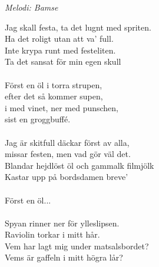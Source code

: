 {\footnotesize\textit{Melodi: Bamse}}\par
\vspace{10pt}
Jag skall festa, ta det lugnt med spriten.\\
Ha det roligt utan att va' full.\\
Inte krypa runt med festeliten.\\
Ta det sansat för min egen skull\\
\\
Först en öl i torra strupen,\\
efter det så kommer supen,\\
i med vinet, ner med punschen,\\
sist en groggbuffé.\\
\\
Jag är skitfull däckar först av alla,\\
missar festen, men vad gör väl det.\\
Blandar hejdlöst öl och gammalk filmjölk\\
Kastar upp på bordsdamen breve'\\
\\
Först en öl...\\
\\
Spyan rinner ner för ylleslipsen.\\
Raviolin torkar i mitt hår.\\
Vem har lagt mig under matsalsbordet?\\
Vems är gaffeln i mitt högra lår?
